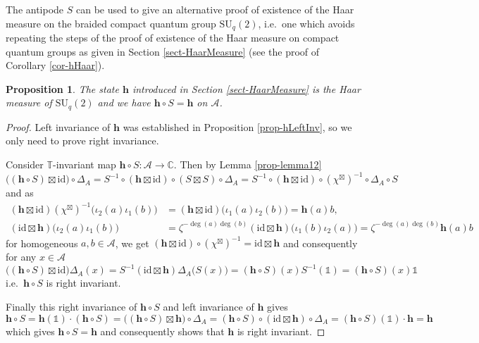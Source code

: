 \documentclass[12pt,reqno,a4paper]{amsart}
\newtheorem{proposition}{Proposition}[section]
\theoremstyle{definition}
\newcommand{\comp}{\circ}
\newcommand{\I}{\mathds{1}}
\newcommand{\id}{\mathrm{id}}
\newcommand{\CC}{\mathbb{C}}
\newcommand{\TT}{\mathbb{T}}
\newcommand{\cA}{\mathscr{A}}
\newcommand{\bh}{{\boldsymbol{h}}}
\newcommand{\SU}{\mathrm{SU}}
\numberwithin{equation}{section}
\begin{document}
The antipode $S$ can be used to give an alternative proof of existence of the Haar measure on the braided compact quantum group $\SU_q(2)$, i.e.~one which avoids repeating the steps of the proof of existence of the Haar measure on compact quantum groups as given in Section \ref{sect-HaarMeasure} (see the proof of Corollary \ref{cor-hHaar}).

\begin{proposition}\label{prop-hRightInv}
The state $\bh$ introduced in Section \ref{sect-HaarMeasure} is the Haar measure of $\SU_q(2)$ and we have $\bh\comp S=\bh$ on $\cA$.
\end{proposition}

\begin{proof}
Left invariance of $\bh$ was established in Proposition \ref{prop-hLeftInv}, so we only need to prove right invariance.

Consider $\TT$-invariant map $\bh\comp S\colon\cA\to\CC$. Then by Lemma \ref{prop-lemma12}
\[
\bigl((\bh\comp S)\boxtimes\id\bigr)\comp\Delta_A
=S^{-1}\comp(\bh\boxtimes\id)\comp(S\boxtimes S)\comp\Delta_A
=S^{-1}\comp(\bh\boxtimes\id)\comp(\chi^\boxtimes)^{-1}\comp\Delta_A\comp S
\]
and as
\begin{align*}
(\bh\boxtimes\id)(\chi^\boxtimes)^{-1}\bigl(\iota_2(a)\iota_1(b)\bigr)
&=(\bh\boxtimes\id)\bigl(\iota_1(a)\iota_2(b)\bigr)=\bh(a)b,\\
(\id\boxtimes\bh)\bigl(\iota_2(a)\iota_1(b)\bigr)
&=\zeta^{-\deg(a)\deg(b)}(\id\boxtimes\bh)\bigl(\iota_1(b)\iota_2(a)\bigr)
=\zeta^{-\deg(a)\deg(b)}\bh(a)b
\end{align*}
for homogeneous $a,b\in\cA$, we get $(\bh\boxtimes\id)\comp(\chi^\boxtimes)^{-1}=\id\boxtimes\bh$ and consequently for any $x\in\cA$
\[
\bigl((\bh\comp S)\boxtimes\id\bigr)\Delta_A(x)
=S^{-1}(\id\boxtimes\bh)\Delta_A\bigl(S(x)\bigr)
=(\bh\comp S)(x)S^{-1}(\I)
=(\bh\comp S)(x)\I
\]
i.e.~$\bh\comp S$ is right invariant.

Finally this right invariance of $\bh\comp S$ and left invariance of $\bh$ gives
\[
\bh\comp S=\bh(\I)\cdot(\bh\comp S)
=\bigl((\bh\comp S)\boxtimes\bh\bigr)\comp\Delta_A
=(\bh\comp S)\comp(\id\boxtimes\bh)\comp\Delta_A
=(\bh\comp S)(\I)\cdot\bh=\bh
\]
which gives $\bh\comp S=\bh$ and consequently shows that $\bh$ is right invariant.
\end{proof}
\end{document}
